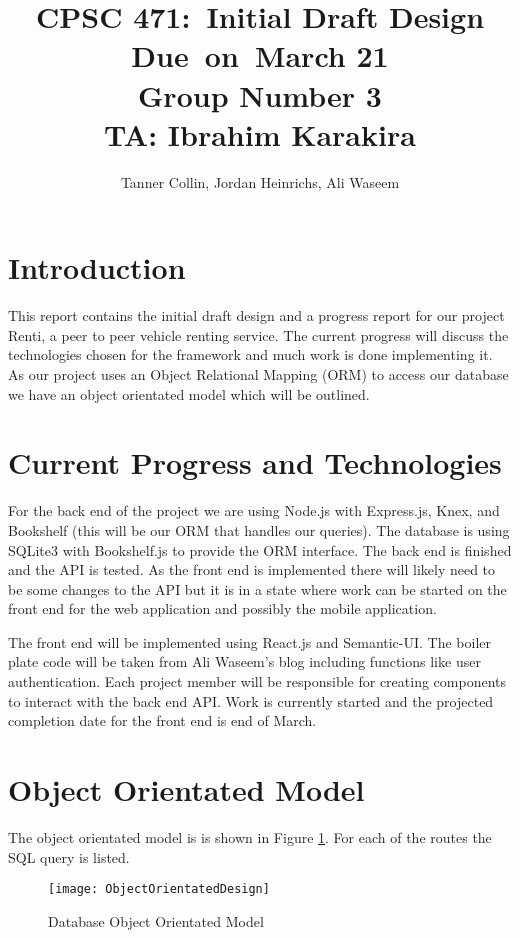 \documentclass{article}
\title{
\vspace{2in}
\textmd{\textbf{CPSC 471:\ Initial Draft Design}}\\
\normalsize\vspace{0.1in}\small{Due\ on\ March 21 \\ Group Number 3 \\ TA: Ibrahim Karakira}\\
\vspace{3in}
}
\author{Tanner Collin, Jordan Heinrichs, Ali Waseem}
\date{}
\begin{document}
\maketitle
\newpage
\tableofcontents
\newpage

\section{Introduction}
This report contains the initial draft design and a progress report for our project Renti, a peer to peer vehicle renting service. The current progress will discuss the
technologies chosen for the framework and much work is done implementing it. As our project uses an Object Relational Mapping (ORM) to access our database we have an
object orientated model which will be outlined. %

\section{Current Progress and Technologies}
For the back end of the project we are using Node.js with Express.js, Knex, and Bookshelf (this will be our ORM that handles our queries). The database is using SQLite3 with Bookshelf.js to provide the ORM interface.
The back end is finished and the API is tested. As the front end is implemented there will likely need to be some changes to the API but it is in a state where work can be started on the front end
for the web application and possibly the mobile application.

The front end will be implemented using React.js and Semantic-UI.
The boiler plate code will be taken from Ali Waseem's blog including functions like user authentication. %
Each project member will be responsible for creating components to interact with the back end API.
Work is currently started and the projected completion date for the front end is end of March.

\section{Object Orientated Model}
The object orientated model is is shown in Figure \ref{fig:oomodel}. For each of the
routes the SQL query is listed.
\begin{figure}[ht!]
    \texttt{[image: ObjectOrientatedDesign]}
    \caption{Database Object Orientated Model}
    \centering
    \label{fig:oomodel}
\end{figure}
\end{document}
